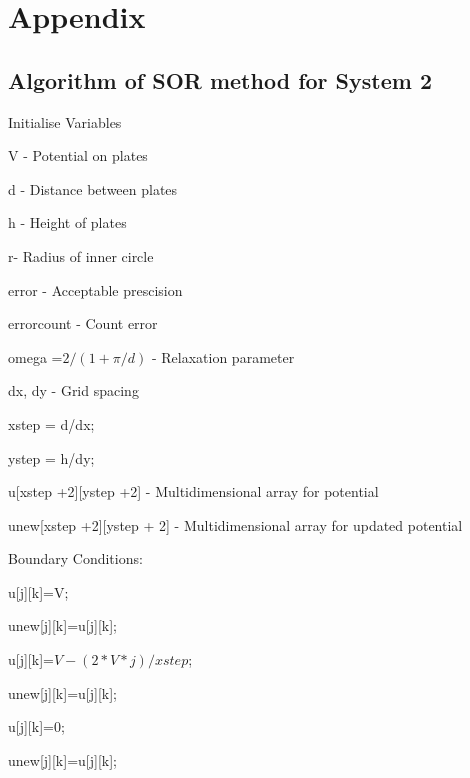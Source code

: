 \documentclass{article}
\begin{document}
\section{Appendix}


\subsection{Algorithm of SOR method for System 2}


\begin{algorithm}


\begin{algorithmic}




\State Initialise Variables


\State V - Potential on plates


\State d - Distance between plates


\State h - Height of plates


\State r- Radius of inner circle


\State error - Acceptable prescision


\State errorcount - Count error


\State omega =$ 2/(1+ \pi/d)$ - Relaxation parameter


\State dx, dy - Grid spacing


\State xstep = d/dx;


\State ystep = h/dy;


\State u[xstep +2][ystep +2] - Multidimensional array for potential


\State unew[xstep +2][ystep + 2] - Multidimensional array for updated potential


\State Boundary Conditions:








\State u[j][k]=V;


\State unew[j][k]=u[j][k];




\State u[j][k]=$V-(2*V*j)/xstep$;


\State unew[j][k]=u[j][k];


\Else


\State u[j][k]=0;


\State unew[j][k]=u[j][k];


\EndIf



\end{algorithmic}
\end{algorithm}
\end{document}
